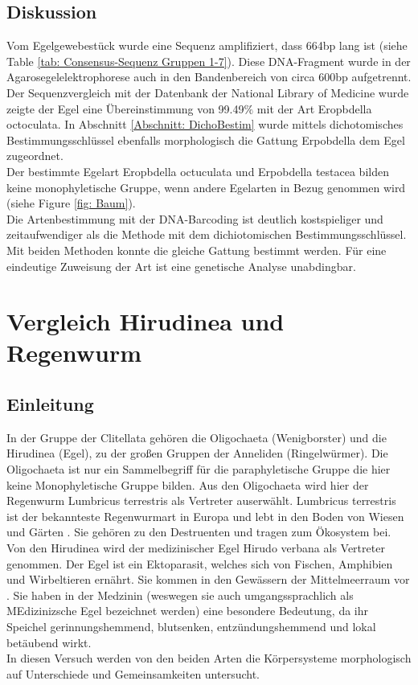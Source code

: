 \documentclass[oneside,10pt,a4paper]{report}
\begin{document}
			\subsection{Diskussion}
				Vom Egelgewebestück wurde eine Sequenz amplifiziert, dass 664bp lang ist (siehe Table \ref{tab: Consensus-Sequenz Gruppen 1-7}). Diese DNA-Fragment wurde in der Agarosegelelektrophorese auch in den Bandenbereich von circa 600bp aufgetrennt.\\
				Der Sequenzvergleich mit der Datenbank der National Library of Medicine wurde zeigte der Egel eine  Übereinstimmung von 99.49$\%$ mit der Art Eropbdella octoculata.  
				In Abschnitt \ref{Abschnitt: DichoBestim} wurde mittels dichotomisches Bestimmungsschlüssel ebenfalls morphologisch die Gattung Erpobdella dem Egel zugeordnet.\\
				Der bestimmte Egelart Eropbdella octuculata und Erpobdella testacea bilden keine monophyletische Gruppe, wenn andere Egelarten in Bezug genommen wird (siehe Figure \ref{fig: Baum}).\\
				Die Artenbestimmung mit der DNA-Barcoding ist deutlich kostspieliger und zeitaufwendiger als die Methode mit dem dichiotomischen Bestimmungsschlüssel. Mit beiden Methoden konnte die gleiche Gattung bestimmt werden.
				Für eine eindeutige Zuweisung der Art ist eine genetische Analyse unabdingbar.

				
		\section{Vergleich Hirudinea und Regenwurm}
			\subsection{Einleitung}
				In der Gruppe der Clitellata gehören die Oligochaeta (Wenigborster) und die Hirudinea (Egel), zu der großen Gruppen der Anneliden (Ringelwürmer).
				Die Oligochaeta ist nur ein Sammelbegriff für die paraphyletische Gruppe die hier keine Monophyletische Gruppe bilden. Aus den Oligochaeta wird hier der Regenwurm Lumbricus terrestris als Vertreter auserwählt. Lumbricus terrestris ist der bekannteste Regenwurmart in Europa und lebt in den Boden von Wiesen und Gärten \cite{regenwurm}. Sie gehören zu den Destruenten und tragen zum Ökosystem bei. Von den Hirudinea wird der medizinischer Egel Hirudo verbana als Vertreter genommen. Der Egel ist ein Ektoparasit, welches sich von Fischen, Amphibien und Wirbeltieren ernährt. Sie kommen in den Gewässern der Mittelmeerraum vor \cite{hirudo}. Sie haben in der Medzinin (weswegen sie auch umgangssprachlich als MEdizinizsche Egel bezeichnet werden) eine besondere Bedeutung, da ihr Speichel gerinnungshemmend, blutsenken, entzündungshemmend und lokal betäubend wirkt.\\
				In diesen Versuch werden von den beiden Arten die Körpersysteme morphologisch auf Unterschiede und Gemeinsamkeiten untersucht.\\
				
\end{document}

